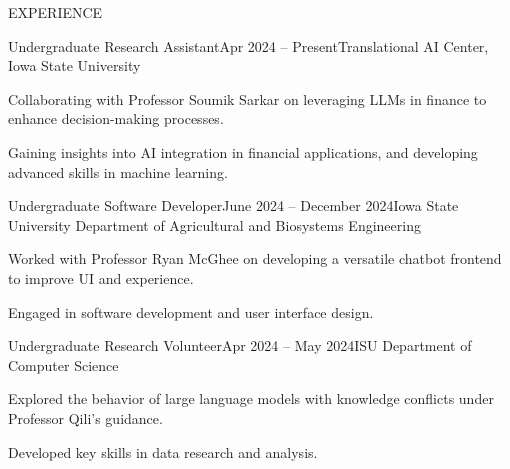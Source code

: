 \documentclass{resume} %
\begin{document}
\begin{rSection}{EXPERIENCE}

\begin{rSubsection}{Undergraduate Research Assistant}{Apr 2024 – Present}{Translational AI Center, Iowa State University}{} 
\item Collaborating with Professor Soumik Sarkar on leveraging LLMs in finance to enhance decision-making processes.
\item Gaining insights into AI integration in financial applications, and developing advanced skills in machine learning.
\end{rSubsection}

\begin{rSubsection}{Undergraduate Software Developer}{June 2024 – December 2024}{Iowa State University Department of Agricultural and Biosystems Engineering}{} 
\item Worked with Professor Ryan McGhee on developing a versatile chatbot frontend to improve UI and experience.
\item Engaged in software development and user interface design.
\end{rSubsection}

\begin{rSubsection}{Undergraduate Research Volunteer}{Apr 2024 – May 2024}{ISU Department of Computer Science}{} 
\item Explored the behavior of large language models with knowledge conflicts under Professor Qili's guidance.
\item Developed key skills in data research and analysis.
\end{rSubsection}

\end{rSection}


\end{document}

